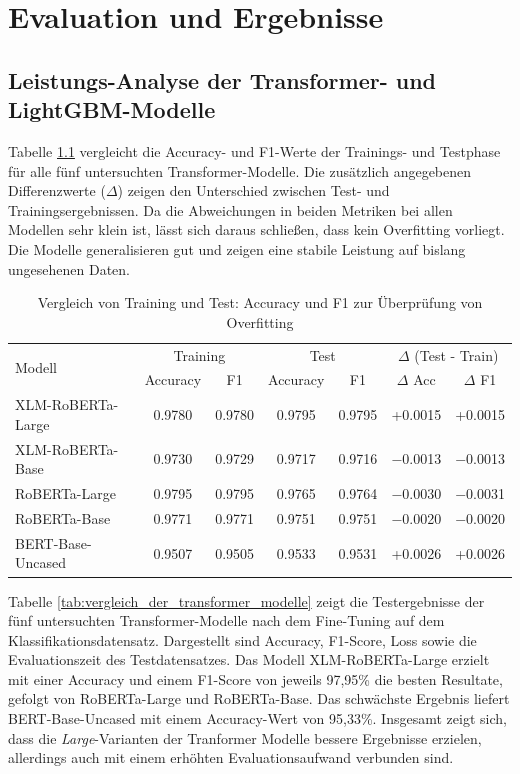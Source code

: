\chapter{Evaluation und Ergebnisse}
\label{chap:evaluation_und_ergebnisse}

\section{Leistungs-Analyse der Transformer- und LightGBM-Modelle}

Tabelle \ref{tab:overfitting_check} vergleicht die Accuracy- und F1-Werte der Trainings- und Testphase für alle fünf untersuchten Transformer-Modelle. 
Die zusätzlich angegebenen Differenzwerte ($\Delta$) zeigen den Unterschied zwischen Test- und Trainingsergebnissen. 
Da die Abweichungen in beiden Metriken bei allen Modellen sehr klein ist, lässt sich daraus schließen, dass kein Overfitting vorliegt. 
Die Modelle generalisieren gut und zeigen eine stabile Leistung auf bislang ungesehenen Daten.

\begin{table}[ht]
\centering
\begin{tabular}{lcccccc}
    \toprule
    \multirow{2}{*}{Modell} & 
    \multicolumn{2}{c}{Training} & 
    \multicolumn{2}{c}{Test} & 
    \multicolumn{2}{c}{$\Delta$ (Test - Train)} \\
    \cmidrule(lr){2-3} \cmidrule(lr){4-5} \cmidrule(l){6-7}
    & Accuracy & F1 & Accuracy & F1 & $\Delta$ Acc & $\Delta$ F1 \\
    \midrule
    XLM-RoBERTa-Large   & 0.9780 & 0.9780 & 0.9795 & 0.9795 & +0.0015 & +0.0015 \\
    XLM-RoBERTa-Base    & 0.9730 & 0.9729 & 0.9717 & 0.9716 & $-$0.0013 & $-$0.0013 \\
    RoBERTa-Large       & 0.9795 & 0.9795 & 0.9765 & 0.9764 & $-$0.0030 & $-$0.0031 \\
    RoBERTa-Base        & 0.9771 & 0.9771 & 0.9751 & 0.9751 & $-$0.0020 & $-$0.0020 \\
    BERT-Base-Uncased   & 0.9507 & 0.9505 & 0.9533 & 0.9531 & +0.0026 & +0.0026 \\
    \bottomrule
\end{tabular}
\caption{Vergleich von Training und Test: Accuracy und F1 zur Überprüfung von Overfitting}
\label{tab:overfitting_check}
\end{table}

Tabelle \ref{tab:vergleich_der_transformer_modelle} zeigt die Testergebnisse der fünf untersuchten Transformer-Modelle nach dem Fine-Tuning auf dem 
Klassifikationsdatensatz. 
Dargestellt sind Accuracy, F1-Score, Loss sowie die Evaluationszeit des Testdatensatzes. Das Modell XLM-RoBERTa-Large erzielt mit einer 
Accuracy und einem F1-Score von jeweils 97,95\% die besten Resultate, gefolgt von RoBERTa-Large und RoBERTa-Base. 
Das schwächste Ergebnis liefert BERT-Base-Uncased mit einem Accuracy-Wert von 95,33\%. Insgesamt zeigt sich, dass die \textit{Large}-Varianten
der Tranformer Modelle bessere Ergebnisse erzielen, allerdings auch mit einem erhöhten Evaluationsaufwand verbunden sind.

